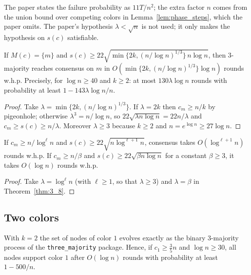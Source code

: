 \begin{remark}
  The paper states the failure probability as $11T/n^2$; the extra factor
  $n$ comes from the union bound over competing colors in
  Lemma~\ref{lem:phase_steps}, which the paper omits. The paper's
  hypothesis $\lambda < \sqrt n$ is not used; it only makes the hypothesis
  on $s(c)$ satisfiable.
\end{remark}

\begin{corollary}[Corollary 3.10]\label{cor:3_10}
  \leanok
  If $M(c) = \{m\}$ and
  $s(c) \ge 22\sqrt{\min\{2k, (n/\log n)^{1/3}\}\,n\log n}$, then 3-majority
  reaches consensus on $m$ in $O(\min\{2k, (n/\log n)^{1/3}\}\log n)$
  rounds w.h.p. Precisely, for $\log n \ge 40$ and $k \ge 2$: at most
  $130\lambda\log n$ rounds with probability at least
  $1 - 143\lambda\log n/n$.
\end{corollary}

\begin{proof}
  \leanok
  Take $\lambda = \min\{2k, (n/\log n)^{1/3}\}$. If $\lambda = 2k$ then
  $c_m \ge n/k$ by pigeonhole; otherwise $\lambda^3 = n/\log n$, so
  $22\sqrt{\lambda n\log n} = 22n/\lambda$ and $c_m \ge s(c) \ge n/\lambda$.
  Moreover $\lambda \ge 3$ because $k \ge 2$ and $n = e^{\log n} \ge 27\log n$.
\end{proof}

\begin{corollary}\label{cor:3_11}
  \leanok
  If $c_m \ge n/\log^\ell n$ and $s(c) \ge 22\sqrt{n\log^{\ell+1}n}$,
  consensus takes $O(\log^{\ell+1} n)$ rounds w.h.p. If $c_m \ge n/\beta$
  and $s(c) \ge 22\sqrt{\beta n\log n}$ for a constant $\beta \ge 3$, it
  takes $O(\log n)$ rounds w.h.p.
\end{corollary}

\begin{proof}
  \leanok
  Take $\lambda = \log^\ell n$ (with $\ell \ge 1$, so that $\lambda \ge 3$)
  and $\lambda = \beta$ in Theorem~\ref{thm:3_8}.
\end{proof}

\subsection{Two colors}

\begin{theorem}\label{thm:binary}
  \leanok
  With $k = 2$ the set of nodes of color $1$ evolves exactly as the binary
  3-majority process of the \texttt{three\_majority} package. Hence, if
  $c_1 \ge \frac35 n$ and $\log n \ge 30$, all nodes support color $1$ after
  $O(\log n)$ rounds with probability at least $1 - 500/n$.
\end{theorem}

